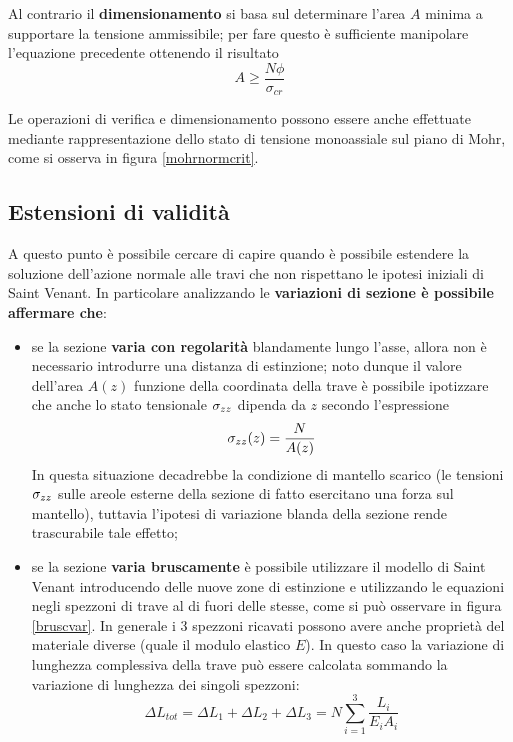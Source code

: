 		Al contrario il \textbf{dimensionamento} si basa sul determinare l'area $A$ minima a supportare la tensione ammissibile; per fare questo è sufficiente manipolare l'equazione precedente ottenendo il risultato
		\[ A \geq \frac{N\phi}{\sigma_{cr}	} \]
		
		Le operazioni di verifica e dimensionamento possono essere anche effettuate mediante rappresentazione dello stato di tensione monoassiale sul piano di Mohr, come si osserva in figura \ref{mohrnormcrit}.
		
		
	\subsection{Estensioni di validità}
		A questo punto è possibile cercare di capire quando è possibile estendere la soluzione dell'azione normale alle travi che non rispettano le ipotesi iniziali di Saint Venant. In particolare analizzando le \textbf{variazioni di sezione è possibile affermare che}:
		\begin{itemize}
			\item se la sezione \textbf{varia con regolarità} blandamente lungo l'asse, allora non è necessario introdurre una distanza di estinzione; noto dunque il valore dell'area $A(z)$ funzione della coordinata della trave è possibile ipotizzare che anche lo stato tensionale $\sigma_{zz}$ dipenda da $z$ secondo l'espressione
			\[ \sigma_{zz} (z) = \frac N {A(z)} \]
			In questa situazione decadrebbe la condizione di mantello scarico (le tensioni $\sigma_{zz}$ sulle areole esterne della sezione di fatto esercitano una forza sul mantello), tuttavia l'ipotesi di variazione blanda della sezione rende trascurabile tale effetto;
			
			\item se la sezione \textbf{varia bruscamente} è possibile utilizzare il modello di Saint Venant introducendo delle nuove  zone di estinzione e utilizzando le equazioni negli spezzoni di trave al di fuori delle stesse, come si può osservare in figura \ref{bruscvar}. In generale i 3 spezzoni ricavati possono avere anche proprietà del materiale diverse (quale il modulo elastico $E$). In questo caso la variazione di lunghezza complessiva  della trave può essere calcolata sommando la variazione di lunghezza dei singoli spezzoni:
			\[ \Delta L_{tot} = \Delta L_1 + \Delta L_2 + \Delta L_3 = N \sum_{i=1}^{3} \frac{L_i}{E_iA_i} \]
			
		\end{itemize}
		
